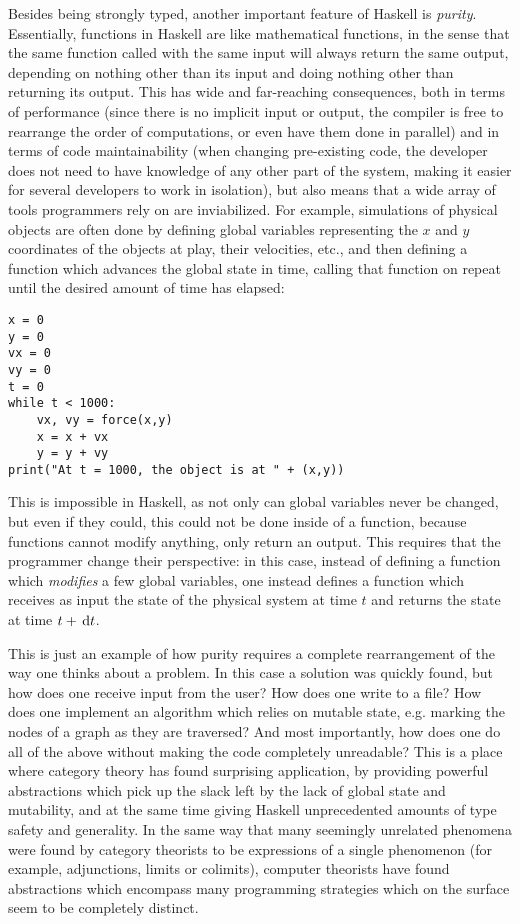\documentclass[11pt]{article}
\theoremstyle{nonumberplain}
\begin{document}
Besides being strongly typed, another important feature of Haskell is \emph{purity}. Essentially, functions in Haskell are like mathematical functions, in the sense that the same function called with the same input will always return the same output, depending on nothing other than its input and doing nothing other than returning its output. This has wide and far-reaching consequences, both in terms of performance (since there is no implicit input or output, the compiler is free to rearrange the order of computations, or even have them done in parallel) and in terms of code maintainability (when changing pre-existing code, the developer does not need to have knowledge of any other part of the system, making it easier for several developers to work in isolation), but also means that a wide array of tools programmers rely on are inviabilized. For example, simulations of physical objects are often done by defining global variables representing the $x$ and $y$ coordinates of the objects at play, their velocities, etc., and then defining a function which advances the global state in time, calling that function on repeat until the desired amount of time has elapsed:
\begin{lstlisting}
x = 0
y = 0
vx = 0
vy = 0
t = 0
while t < 1000:
	vx, vy = force(x,y)
	x = x + vx
	y = y + vy
print("At t = 1000, the object is at " + (x,y))
\end{lstlisting}

This is impossible in Haskell, as not only can global variables never be changed, but even if they could, this could not be done inside of a function, because functions cannot modify anything, only return an output. This requires that the programmer change their perspective: in this case, instead of defining a function which \emph{modifies} a few global variables, one instead defines a function which receives as input the state of the physical system at time $t$ and returns the state at time $t + \dl t$. 

This is just an example of how purity requires a complete rearrangement of the way one thinks about a problem. In this case a solution was quickly found, but how does one receive input from the user? How does one write to a file? How does one implement an algorithm which relies on mutable state, e.g. marking the nodes of a graph as they are traversed? And most importantly, how does one do all of the above without making the code completely unreadable? This is a place where category theory has found surprising application, by providing powerful abstractions which pick up the slack left by the lack of global state and mutability, and at the same time giving Haskell unprecedented amounts of type safety and generality. In the same way that many seemingly unrelated phenomena were found by category theorists to be expressions of a single phenomenon (for example, adjunctions, limits or colimits), computer theorists have found abstractions which encompass many programming strategies which on the surface seem to be completely distinct.
\end{document}
